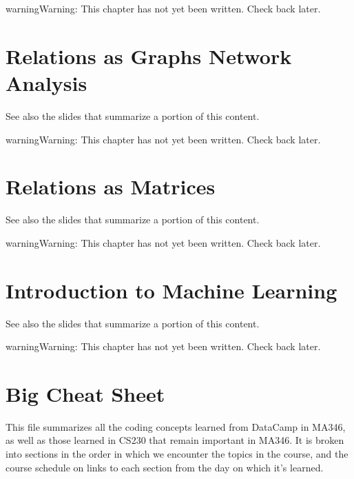 \documentclass[letterpaper,10pt,english]{sphinxmanual}
\begin{document}
\begin{sphinxadmonition}{warning}{Warning:}
This chapter has not yet been written.  Check back later.
\end{sphinxadmonition}


\chapter{Relations as Graphs \sphinxhyphen{} Network Analysis}
\label{\detokenize{chapter-15-networks:relations-as-graphs-network-analysis}}\label{\detokenize{chapter-15-networks::doc}}
See also the slides that summarize a portion of this content.

\begin{sphinxadmonition}{warning}{Warning:}
This chapter has not yet been written.  Check back later.
\end{sphinxadmonition}


\chapter{Relations as Matrices}
\label{\detokenize{chapter-16-matrices:relations-as-matrices}}\label{\detokenize{chapter-16-matrices::doc}}
See also the slides that summarize a portion of this content.

\begin{sphinxadmonition}{warning}{Warning:}
This chapter has not yet been written.  Check back later.
\end{sphinxadmonition}


\chapter{Introduction to Machine Learning}
\label{\detokenize{chapter-17-machine-learning:introduction-to-machine-learning}}\label{\detokenize{chapter-17-machine-learning::doc}}
See also the slides that summarize a portion of this content.

\begin{sphinxadmonition}{warning}{Warning:}
This chapter has not yet been written.  Check back later.
\end{sphinxadmonition}


\chapter{Big Cheat Sheet}
\label{\detokenize{big-cheat-sheet:big-cheat-sheet}}\label{\detokenize{big-cheat-sheet::doc}}
This file summarizes all the coding concepts learned from DataCamp in MA346, as well as those learned in CS230 that remain important in MA346.  It is broken into sections in the order in which we encounter the topics in the course, and the course schedule on {\hyperref[\detokenize{intro::doc}]{}} links to each section from the day on which it’s learned.
\end{document}
